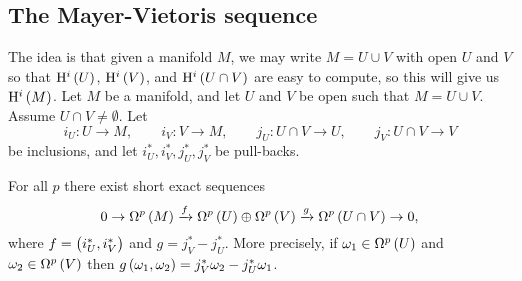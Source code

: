 \pagebreak

\subsection{The Mayer-Vietoris sequence}

The idea is that given a manifold $ M $, we may write $ M = U \cup V $ with open $ U $ and $ V $ so that $ \H^i\br{U} $, $ \H^i\br{V} $, and $ \H^i\br{U \cap V} $ are easy to compute, so this will give us $ \H^i\br{M} $. Let $ M $ be a manifold, and let $ U $ and $ V $ be open such that $ M = U \cup V $. Assume $ U \cap V \ne \emptyset $. Let
$$ i_U : U \to M, \qquad i_V : V \to M, \qquad j_U : U \cap V \to U, \qquad j_V : U \cap V \to V $$
be inclusions, and let $ i_U^*, i_V^*, j_U^*, j_V^* $ be pull-backs.

\begin{proposition}
\label{prop:2.28}
For all $ p $ there exist short exact sequences
$$ 0 \to \Omega^p\br{M} \xrightarrow{f} \Omega^p\br{U} \oplus \Omega^p\br{V} \xrightarrow{g} \Omega^p\br{U \cap V} \to 0, $$
where $ f = \br{i_U^*, i_V^*} $ and $ g = j_V^* - j_U^* $. More precisely, if $ \omega_1 \in \Omega^p\br{U} $ and $ \omega_2 \in \Omega^p\br{V} $ then $ g\br{\omega_1, \omega_2} = j_V^*\omega_2 - j_U^*\omega_1 $.
\end{proposition}


